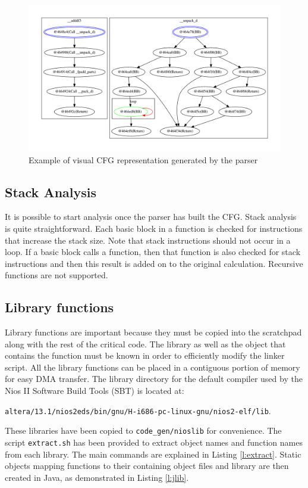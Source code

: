 \documentclass[table,11pt]{article}
\begin{document}
\begin{figure}  
\centering
\includegraphics[scale=0.4]{figures/cfg.pdf}
\caption{Example of visual CFG representation generated by the parser}
\label{f:exdot}
\end{figure}



\subsection{Stack Analysis}
It is possible to start analysis once the parser has built the CFG. Stack analysis is quite straightforward. Each basic block in a function is checked for instructions that increase the stack size. Note that stack instructions should not occur in a loop. If a basic block calls a function, then that function is also checked for stack instructions and then this result is added on to the original calculation. Recursive functions are not supported.

\subsection{Library functions}
Library functions are important because they must be copied into the scratchpad along with the rest of the critical code. The library as well as the object that contains the function must be known in order to efficiently modify the linker script. All the library functions can be placed in a contiguous portion of memory for easy DMA transfer. The library directory for the default compiler used by the Nios II Software Build Tools (SBT) is located at: 

\texttt{altera/13.1/nios2eds/bin/gnu/H-i686-pc-linux-gnu/nios2-elf/lib}. 

These libraries have been copied to \texttt{code\_gen/nioslib} for convenience. The script \texttt{extract.sh} has been provided to extract object names and function names from each library. The main commands are explained in Listing \ref{l:extract}. Static objects mapping functions to their containing object files and library are then created in Java, as demonstrated in Listing \ref{l:jlib}.
\end{document}
